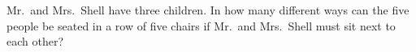 Mr.\ and Mrs.\ Shell have three children. In how many different ways can the five people be seated in a row of five chairs if Mr.\ and Mrs.\ Shell must sit next to each other?
